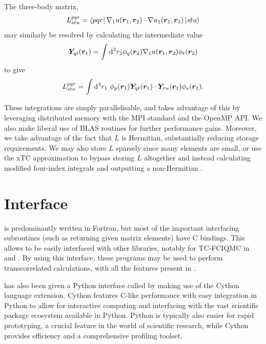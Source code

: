The three-body matrix,
\begin{equation}
    L^{pqr}_{stu} = \bra{pqr}\nabla_1u(\bm r_1, \bm r_2)\cdot \nabla u_1(\bm r_1, \bm r_3)\ket{stu}
\end{equation}
may similarly be resolved by calculating the intermediate value
\begin{equation}
    \bm Y_{qt}(\bm r_1) = \int\mathrm{d}^3 r_2\phi_q(\bm r_2)\nabla_1u(\bm r_1, \bm r_2)\phi_t(\bm r_2)
\end{equation}
to give
\begin{equation}
    L^{pqr}_{stu} = \int\mathrm{d}^3 r_1\ \phi_p(\bm r_1)\bm Y_{qt}(\bm r_1)\cdot\bm Y_{ru}(\bm r_1)\phi_s(\bm r_1).
\end{equation}

These integrations are simply parallelisable, and \tchint takes advantage of this by leveraging distributed memory with the \gls{MPI} standard and the OpenMP \gls{API}. We also make liberal use of BLAS routines for further performance gains. Moreover, we take advantage of the fact that $L$ is Hermitian, substantially reducing storage requirements. We may also store $L$ sparsely since many elements are small, or use the \gls{xTC} approximation to bypass storing $L$ altogether and instead calculating modified four-index integrals and outputting a non-Hermitian \fcidump.

\section{Interface}

\tchint is predominantly written in Fortran, but most of the important interfacing subroutines (such as returning given matrix elements) have C bindings. This allows \tchint to be easily interfaced with other libraries, notably for \gls{TC}-\gls{FCIQMC} in \neci\supercite{gutherNECI2020} and \mseven.\supercite{andersonRobertanderson2024} By using this interface, these programs may be used to perform transcorrelated calculations, with all the features present in \tchint.

\tchint has also been given a Python interface called \pytchint by making use of the Cython language extension. Cython features C-like performance with easy integration in Python to allow for interactive computing and interfacing with the vast scientific package ecosystem available in Python. Python is typically also easier for rapid prototyping, a crucial feature in the world of scientific research, while Cython provides efficiency and a comprehensive profiling toolset.

